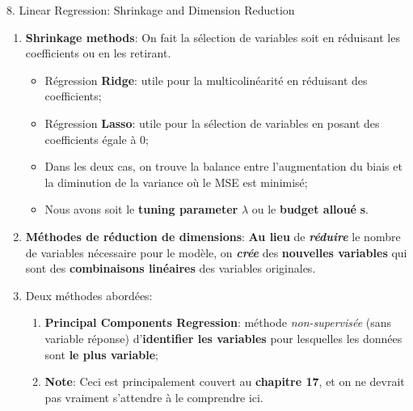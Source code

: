 \documentclass[12pt, titlepage, french]{report}
\begin{document}
\begin{CHPT_SUMM}{8. Linear Regression:  Shrinkage and Dimension Reduction}
\begin{enumerate}
	\item	\textbf{Shrinkage methods}: On fait la sélection de variables soit en réduisant les coefficients ou en les retirant.
	\begin{itemize}
		\item	Régression \textbf{Ridge}: utile pour la multicolinéarité en réduisant des coefficients;
		\item	Régression \textbf{Lasso}: utile pour la sélection de variables en posant des coefficients égale à 0;
		\item	Dans les deux cas, on trouve la balance entre l'augmentation du biais et la diminution de la variance où le MSE est minimisé;
		\item	Nous avons soit le \textbf{tuning parameter} $\lambda$ ou le \textbf{budget alloué} \textbf{s}.
	\end{itemize}
	\item	\textbf{Méthodes de réduction de dimensions}: \textbf{Au lieu} de \textit{\textbf{réduire}} le nombre de variables nécessaire pour le modèle, on \textbf{\textit{crée}} des \textbf{nouvelles variables} qui sont des \textbf{combinaisons linéaires} des variables originales.
	\item[]	Deux méthodes abordées: 
	\begin{enumerate}
		\item	\textbf{Principal Components Regression}: méthode \textit{non-supervisée} (sans variable réponse) d'\textbf{identifier les variables} pour lesquelles les données sont \textbf{le plus variable};
		\item[]	\textbf{Note}: Ceci est principalement couvert au \textbf{chapitre 17}, et on ne devrait pas vraiment s'attendre à le comprendre ici.
		\begin{itemize}

\end{itemize}
\end{enumerate}
\end{enumerate}
\end{CHPT_SUMM}
\end{document}
